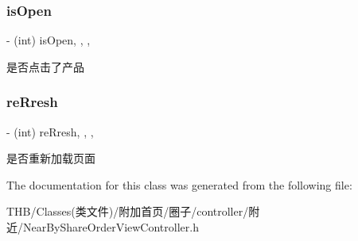 \subsubsection{\texorpdfstring{is\+Open}{isOpen}}
{\footnotesize\ttfamily -\/ (int) is\+Open\hspace{0.3cm}{\ttfamily [read]}, {\ttfamily [write]}, {\ttfamily [nonatomic]}, {\ttfamily [assign]}}

是否点击了产品 \mbox{\label{interface_near_by_share_order_view_controller_aa3d93d60a04fdfc3d415df7f0fa381b6}} 
\subsubsection{\texorpdfstring{re\+Rresh}{reRresh}}
{\footnotesize\ttfamily -\/ (int) re\+Rresh\hspace{0.3cm}{\ttfamily [read]}, {\ttfamily [write]}, {\ttfamily [nonatomic]}, {\ttfamily [assign]}}

是否重新加载页面 

The documentation for this class was generated from the following file\+:\begin{DoxyCompactItemize}
\item 
T\+H\+B/\+Classes(类文件)/附加首页/圈子/controller/附近/Near\+By\+Share\+Order\+View\+Controller.\+h\end{DoxyCompactItemize}
